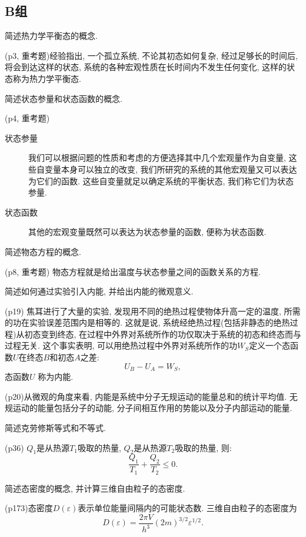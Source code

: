 \subsection{B组}
\begin{questions}
  \question 简述热力学平衡态的概念.
  \begin{solution}
    (p3, 重考题)经验指出, 一个孤立系统, 不论其初态如何复杂, 经过足够长的时间后, 将会到达这样的状态, 系统的各种宏观性质在长时间内不发生任何变化, 这样的状态称为热力学平衡态.
  \end{solution}
  \question 简述状态参量和状态函数的概念.
  \begin{solution}
    (p4, 重考题)
    \begin{description}
      \item[状态参量]  我们可以根据问题的性质和考虑的方便选择其中几个宏观量作为自变量, 这些自变量本身可以独立的改变, 我们所研究的系统的其他宏观量又可以表达为它们的函数. 这些自变量就足以确定系统的平衡状态, 我们称它们为状态参量.
      \item[状态函数] 其他的宏观变量既然可以表达为状态参量的函数, 便称为状态函数.
    \end{description}
  \end{solution}
  \question 简述物态方程的概念.
  \begin{solution}
    (p8, 重考题) 物态方程就是给出温度与状态参量之间的函数关系的方程.
  \end{solution}
  \question 简述如何通过实验引入内能, 并给出内能的微观意义.
  \begin{solution}
    (p19) 焦耳进行了大量的实验, 发现用不同的绝热过程使物体升高一定的温度, 所需的功在实验误差范围内是相等的. 这就是说, 系统经绝热过程(包括非静态的绝热过程)从初态变到终态, 在过程中外界对系统所作的功仅取决于系统的初态和终态而与过程无关. 这个事实表明, 可以用绝热过程中外界对系统所作的功$W_S$定义一个态函数$U$在终态$B$和初态$A$之差:
    \begin{equation}
      U_B - U_A = W_S,
    \end{equation}
    态函数$U$ 称为内能.

    (p20)从微观的角度来看, 内能是系统中分子无规运动的能量总和的统计平均值. 无规运动的能量包括分子的动能, 分子间相互作用的势能以及分子内部运动的能量.
  \end{solution}
  \question 简述克劳修斯等式和不等式.
  \begin{solution}
    (p36) $Q_1$是从热源$T_1$吸取的热量, $Q_2$是从热源$T_2$吸取的热量, 则:
    \begin{equation}
      \frac{Q_1}{T_1} + \frac{Q_2}{T_2} \leq 0.
    \end{equation}
  \end{solution}
  \question 简述态密度的概念, 并计算三维自由粒子的态密度.
  \begin{solution}
    (p173)态密度$D(\varepsilon)$表示单位能量间隔内的可能状态数. 三维自由粒子的态密度为
    \begin{equation}
      D(\varepsilon) = \frac{2\pi V}{h^3}(2m)^{3/2}\varepsilon^{1/2}.
    \end{equation}
  \end{solution}
\end{questions}